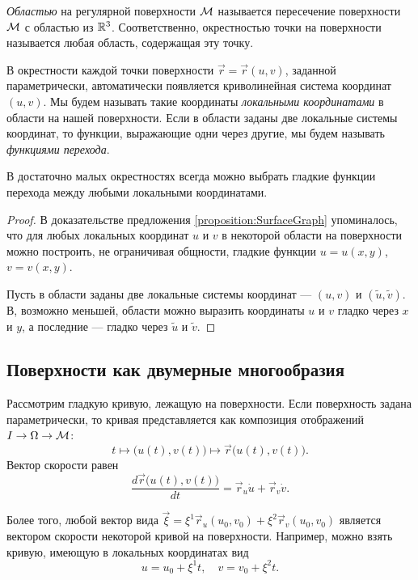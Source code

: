 \begin{definition}
	\textit{Областью} на регулярной поверхности $\mathcal{M}$ называется пересечение поверхности $\mathcal{M}$ с областью из $\mathbb{R}^3$. Соответственно, окрестностью точки на поверхности называется любая область, содержащая эту точку.
\end{definition}

В окрестности каждой точки поверхности $\vec{r} = \vec{r}(u, v)$, заданной параметрически, автоматически появляется криволинейная система координат $(u, v)$. Мы будем называть такие координаты \textit{локальными координатами} в области на нашей поверхности. Если в области заданы две локальные системы координат, то функции, выражающие одни через другие, мы будем называть \textit{функциями перехода}.

\begin{lemma} \label{lemma:SmoothLocal}
	В достаточно малых окрестностях всегда можно выбрать гладкие функции перехода между любыми локальными координатами.
\end{lemma}

\begin{proof}
	В доказательстве предложения \ref{proposition:SurfaceGraph} упоминалось, что для любых локальных координат $u$ и $v$ в некоторой области на поверхности можно построить, не ограничивая общности, гладкие функции $u = u(x, y)$, $v = v(x, y)$.

	Пусть в области заданы две локальные системы координат --- $(u, v)$ и $(\widetilde{u}, \widetilde{v})$. В, возможно меньшей, области можно выразить координаты $u$ и $v$ гладко через $x$ и $y$, а последние --- гладко через $\widetilde{u}$ и $\widetilde{v}$.
\end{proof}

\subsection{Поверхности как двумерные многообразия}

Рассмотрим гладкую кривую, лежащую на поверхности. Если поверхность задана параметрически, то кривая представляется как композиция отображений $I \to \Omega \to \mathcal{M}$:
\[
	t \mapsto \big(u(t), v(t)\big) \mapsto \vec{r}\big(u(t), v(t)\big).
\]
Вектор скорости равен
\[
	\frac{d\vec{r}\big(u(t), v(t)\big)}{dt} = \vec{r}_u\dot{u} + \vec{r}_v\dot{v}.
\]

Более того, любой вектор вида $\vec{\xi} = \xi^1\vec{r}_u(u_0, v_0) + \xi^2\vec{r}_v(u_0, v_0)$ является вектором скорости некоторой кривой на поверхности. Например, можно взять кривую, имеющую в локальных координатах вид
\[
	u = u_0 + \xi^1t,\quad v = v_0 + \xi^2t.
\]

